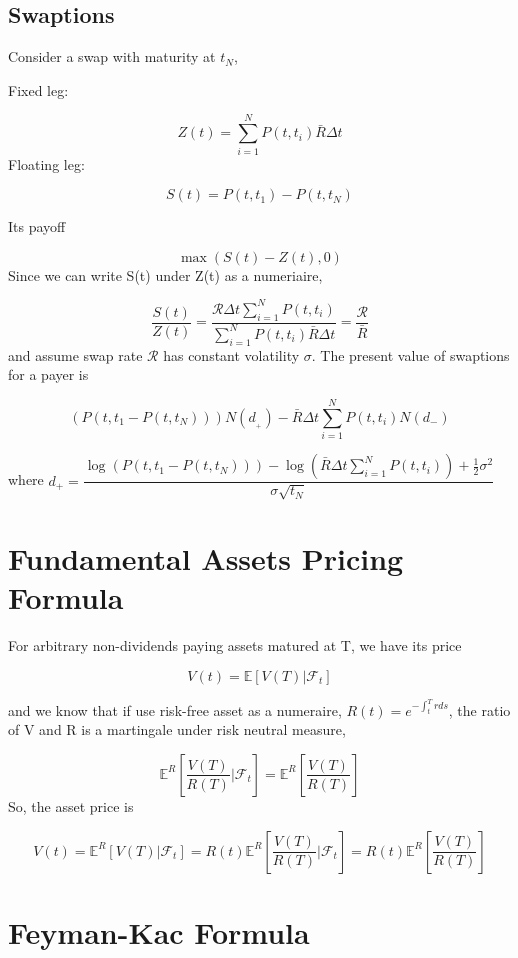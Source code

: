 \documentclass[a4]{article}
\begin{document}
\subsection{Swaptions}
Consider a swap with maturity at $t_{N}$,\par 
\bigbreak 
\noindent Fixed leg: \par 
$$
Z(t) = \sum_{i=1}^{N}P(t, t_{i})\bar R\Delta t
$$
\bigbreak 
\noindent Floating leg: \par 
$$
S(t) = P(t, t_{1}) - P(t, t_{N})
$$\par 
\bigbreak
\noindent Its payoff \par 
$$
\max(S(t) - Z(t), 0)
$$
Since we can write S(t) under Z(t) as a numeriaire,\par 
$$
\dfrac{S(t)}{Z(t)} = \dfrac{\mathcal{R}\Delta t\sum_{i=1}^{N}P(t, t_{i})}{\sum_{i=1}^{N}P(t, t_{i})\bar R\Delta t}=\dfrac{\mathcal{R}}{\bar R}
$$ and assume swap rate $\mathcal{R}$ has constant volatility $\sigma$. The present value of swaptions for a payer is\par 
$$
(P(t, t_{1} - P(t,t_{N}))) N(d_{_{+}}) - \bar R\Delta t \sum_{i=1}^{N}P(t, t_{i}) N(d_{-})
$$\par 
where $d_{+} = \dfrac{\log(P(t, t_{1} - P(t,t_{N}))) -\log(\bar R\Delta t \sum_{i=1}^{N}P(t, t_{i}) ) + \frac{1}{2}\sigma^{2} }{\sigma\sqrt{t_{N}}}$
\appendix
\section{Fundamental Assets Pricing Formula}
For arbitrary non-dividends paying assets matured at T, we have its price \par 
$$
V(t) = \mathbb{E}[V(T)|\mathcal{F}_{t}]
$$\par 
and we know that if use risk-free asset as a numeraire, $R(t) = e^{-\int^{T}_{t}rds}$, the ratio of V and R is a martingale under risk neutral measure,\par 
$$
\mathbb{E}^{R}[\dfrac{V(T)}{R(T)}|\mathcal{F}_{t}] = \mathbb{E}^{R}[\dfrac{V(T)}{R(T)}]
$$
So, the asset price is \par 
$$
V(t) = \mathbb{E}^{R}[V(T)|\mathcal{F}_{t}] =  R(t)\mathbb{E}^{R}[\dfrac{V(T)}{R(T)}|\mathcal{F}_{t}]=  R(t)\mathbb{E}^{R}[\dfrac{V(T)}{R(T)}]
$$
\section{Feyman-Kac Formula}
\end{document}
